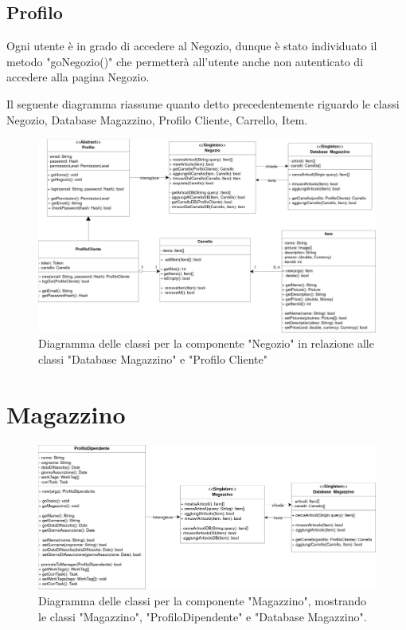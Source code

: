 \documentclass{report}
\begin{document}
\subsection*{Profilo}
Ogni utente è in grado di accedere al Negozio, dunque è stato individuato il metodo "goNegozio()" che permetterà all'utente anche non autenticato di accedere alla pagina Negozio.

Il seguente diagramma riassume quanto detto precedentemente riguardo le classi Negozio, Database Magazzino, Profilo Cliente, Carrello, Item.


\begin{figure}[H]
	\centering\includegraphics[width=1\textwidth]{images/Diagramma_delle_classi_negozio_1.png}
	Diagramma delle classi per la componente "Negozio" in relazione alle classi "Database Magazzino" e "Profilo Cliente"
\end{figure}



\section{Magazzino}

\begin{figure}[H]
	\centering\includegraphics[width=1\textwidth]{images/Diagramma_delle_classi_magazzino.png}
	Diagramma delle classi per la componente "Magazzino", mostrando le classi "Magazzino", "ProfiloDipendente" e "Database Magazzino".
\end{figure}
\end{document}
